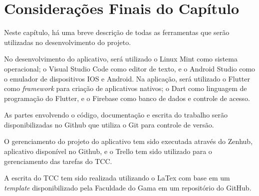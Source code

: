 \section{Considerações Finais do Capítulo}

Neste capítulo, há uma breve descrição de todas as ferramentas que serão 
utilizadas no desenvolvimento do projeto. 

No desenvolvimento do aplicativo, será utilizado o Linux Mint como sistema 
operacional; o Visual Studio Code como editor de texto, e o Android Studio como 
o emulador de dispositivos IOS e Android. Na aplicação, será utilizado o Flutter 
como \emph{framework} para criação de aplicativos nativos; o Dart como linguagem 
de programação do Flutter, e o Firebase como banco de dados e controle de acesso. 

As partes envolvendo o código, documentação e escrita do trabalho serão disponibilizadas 
no Github que utiliza o Git para controle de versão.

O gerenciamento do projeto do aplicativo tem sido executada através do Zenhub, aplicativo disponível no Github, e o Trello tem sido utilizado para o gerenciamento das tarefas do TCC. 

A escrita do TCC tem sido realizada utilizando o LaTex com base em um \emph{template} 
disponibilizado pela Faculdade do Gama em um repositório do GitHub. 

